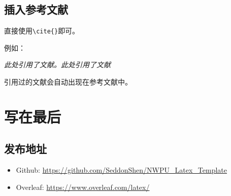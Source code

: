 \documentclass[12pt,hyperref,a4paper,UTF8,fontset=fandol]{ctexart}
\begin{document}
%
%
%
%
%
%

\subsection{插入参考文献}
直接使用\verb|\cite{}|即可。

例如：


   \textit{ 此处引用了文献\cite{0Isaac}。此处引用了文献\cite{2016The}}


引用过的文献会自动出现在参考文献中。

\section{写在最后}
\subsection{发布地址}
\begin{itemize}
    \item Github: \url{https://github.com/SeddonShen/NWPU_Latex_Template}
    \item Overleaf:  \url{https://www.overleaf.com/latex/}
\end{itemize}


\end{document}
